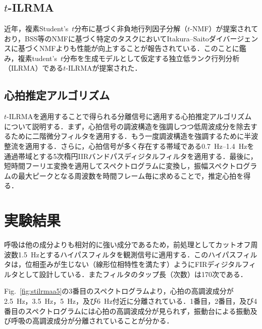 \documentclass[a4j]{jsarticle}
\begin{document}
\section{}

\subsection{$t$-ILRMA}
近年，複素Student's~$t$分布に基づく非負地行列因子分解（$t$-NMF）\cite{tnmf}が提案されており，BSS等のNMFに基づく特定のタスクにおいてItakura--Saitoダイバージェンスに基づくNMF\cite{isnmf}よりも性能が向上することが報告されている．このことに鑑み，複素tudent's~$t$分布を生成モデルとして仮定する独立低ランク行列分析（ILRMA）\cite{ILRMA,Kitamura2018_ilrma}である$t$-ILRMAが提案された\cite{tdist1,tdist2}．

\subsection{心拍推定アルゴリズム}
$t$-ILRMAを適用することで得られる分離信号に適用する心拍推定アルゴリズムについて説明する．まず，心拍信号の調波構造を強調しつつ低周波成分を除去するために二階微分フィルタを適用する．もう一度調波構造を強調するために半波整流を適用する．さらに，心拍信号が多く存在する帯域である0.7~Hz--1.4~Hzを通過帯域とする5次楕円IIRバンドパスディジタルフィルタを適用する．最後に，短時間フーリエ変換を適用してスペクトログラムに変換し，振幅スペクトログラムの最大ピークとなる周波数を時間フレーム毎に求めることで，推定心拍を得る．

\section{実験結果}
呼吸は他の成分よりも相対的に強い成分であるため，前処理としてカットオフ周波数1.5~Hzとするハイパスフィルタを観測信号に適用する．このハイパスフィルタは，位相歪みが生じない（線形位相特性を満たす）ようにFIRディジタルフィルタとして設計している．またフィルタのタップ長（次数）は170次である．

Fig.~\ref{fig:stilrmaa5}の3番目のスペクトログラムより，心拍の高調波成分が2.5~Hz，3.5~Hz，5~Hz，及び6~Hz付近に分離されている．1番目，2番目，及び4番目のスペクトログラムには心拍の高調波成分が見られず，振動台による振動及び呼吸の高調波成分が分離されていることが分かる．
\end{document}
